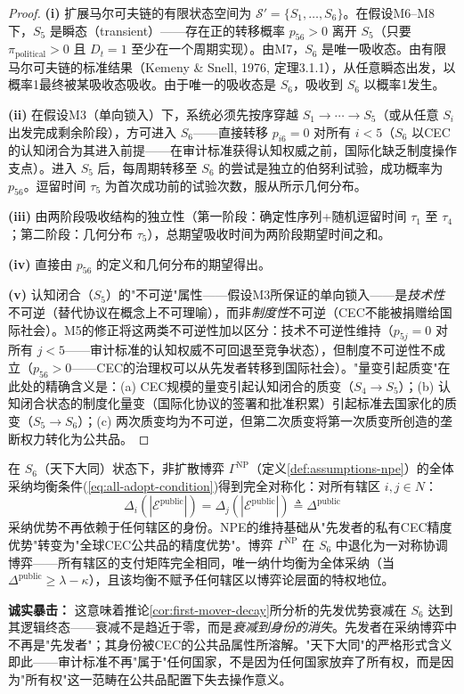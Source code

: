 \documentclass[12pt,a4paper]{ctexart}
\theoremstyle{definition}
\theoremstyle{remark}
\begin{document}
\begin{proof}
\textbf{(i)} 扩展马尔可夫链的有限状态空间为 $\mathcal{S}' = \{S_1, \ldots, S_6\}$。在假设M6--M8下，$S_5$ 是瞬态（transient）——存在正的转移概率 $p_{56} > 0$ 离开 $S_5$（只要 $\pi_{\text{political}} > 0$ 且 $D_t = 1$ 至少在一个周期实现）。由M7，$S_6$ 是唯一吸收态。由有限马尔可夫链的标准结果（Kemeny \& Snell, 1976, 定理3.1.1），从任意瞬态出发，以概率1最终被某吸收态吸收。由于唯一的吸收态是 $S_6$，吸收到 $S_6$ 以概率1发生。

\textbf{(ii)} 在假设M3（单向锁入）下，系统必须先按序穿越 $S_1 \to \cdots \to S_5$（或从任意 $S_i$ 出发完成剩余阶段），方可进入 $S_6$——直接转移 $p_{i6} = 0$ 对所有 $i < 5$（$S_6$ 以CEC的认知闭合为其进入前提——在审计标准获得认知权威之前，国际化缺乏制度操作支点）。进入 $S_5$ 后，每周期转移至 $S_6$ 的尝试是独立的伯努利试验，成功概率为 $p_{56}$。逗留时间 $\tau_5$ 为首次成功前的试验次数，服从所示几何分布。

\textbf{(iii)} 由两阶段吸收结构的独立性（第一阶段：确定性序列+随机逗留时间 $\tau_1$ 至 $\tau_4$；第二阶段：几何分布 $\tau_5$），总期望吸收时间为两阶段期望时间之和。

\textbf{(iv)} 直接由 $p_{56}$ 的定义和几何分布的期望得出。

\textbf{(v)} 认知闭合（$S_5$）的"不可逆"属性——假设M3所保证的单向锁入——是\textit{技术性}不可逆（替代协议在概念上不可理喻），而非\textit{制度性}不可逆（CEC不能被捐赠给国际社会）。M5的修正将这两类不可逆性加以区分：技术不可逆性维持（$p_{5j} = 0$ 对所有 $j < 5$——审计标准的认知权威不可回退至竞争状态），但制度不可逆性不成立（$p_{56} > 0$——CEC的治理权可以从先发者转移到国际社会）。"量变引起质变"在此处的精确含义是：(a) CEC规模的量变引起认知闭合的质变（$S_4 \to S_5$）；(b) 认知闭合状态的制度化量变（国际化协议的签署和批准积累）引起标准去国家化的质变（$S_5 \to S_6$）；(c) 两次质变均为不可逆，但第二次质变将第一次质变所创造的垄断权力转化为公共品。
\end{proof}

\begin{corollary}
\label{cor:S6-adoption-equivalence}
在 $S_6$（天下大同）状态下，非扩散博弈 $\Gamma^{\text{NP}}$（定义\ref{def:assumptions-npe}）的全体采纳均衡条件(\ref{eq:all-adopt-condition})得到完全对称化：对所有辖区 $i, j \in N$：
\begin{equation}
\Delta_i(|\mathcal{E}^{\text{public}}|) = \Delta_j(|\mathcal{E}^{\text{public}}|) \triangleq \Delta^{\text{public}}
\end{equation}
采纳优势不再依赖于任何辖区的身份。NPE的维持基础从"先发者的私有CEC精度优势"转变为"全球CEC公共品的精度优势"。博弈 $\Gamma^{\text{NP}}$ 在 $S_6$ 中退化为一对称协调博弈——所有辖区的支付矩阵完全相同，唯一纳什均衡为全体采纳（当 $\Delta^{\text{public}} \geq \lambda - \kappa$），且该均衡不赋予任何辖区以博弈论层面的特权地位。

\textbf{诚实暴击：} 这意味着推论\ref{cor:first-mover-decay}所分析的先发优势衰减在 $S_6$ 达到其逻辑终态——衰减不是趋近于零，而是\textit{衰减到身份的消失}。先发者在采纳博弈中不再是"先发者"；其身份被CEC的公共品属性所溶解。"天下大同"的严格形式含义即此——审计标准不再"属于"任何国家，不是因为任何国家放弃了所有权，而是因为"所有权"这一范畴在公共品配置下失去操作意义。
\end{corollary}
\end{document}

